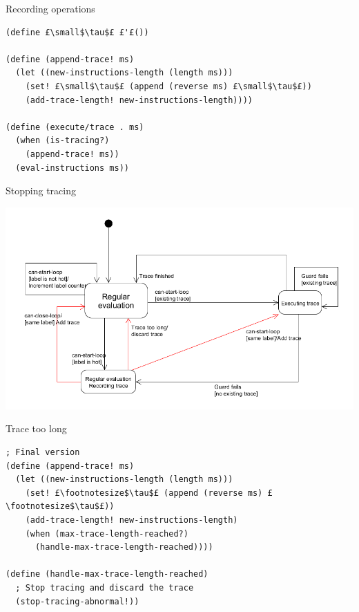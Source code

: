 \documentclass{beamer}
\begin{document}
\begin{frame}[fragile]{Recording operations}

\begin{lstlisting}[basicstyle = \small\ttfamily, escapechar = £]
(define £\small$\tau$£ £'£())

(define (append-trace! ms)
  (let ((new-instructions-length (length ms)))
    (set! £\small$\tau$£ (append (reverse ms) £\small$\tau$£))
    (add-trace-length! new-instructions-length))))

(define (execute/trace . ms)
  (when (is-tracing?)
    (append-trace! ms))
  (eval-instructions ms))
\end{lstlisting}

\end{frame}

\begin{frame}[fragile]{Stopping tracing}

\centering
\includegraphics[scale=0.3]{high_level_state_diagram_stopping_tracing.png}

\end{frame}

\begin{frame}[fragile]{Trace too long}

\begin{lstlisting}[basicstyle = \footnotesize\ttfamily, escapechar = £]
; Final version
(define (append-trace! ms)
  (let ((new-instructions-length (length ms)))
    (set! £\footnotesize$\tau$£ (append (reverse ms) £\footnotesize$\tau$£))
    (add-trace-length! new-instructions-length)
    (when (max-trace-length-reached?)
      (handle-max-trace-length-reached))))
      
(define (handle-max-trace-length-reached)
  ; Stop tracing and discard the trace
  (stop-tracing-abnormal!))
\end{lstlisting}

\end{frame}
\end{document}
